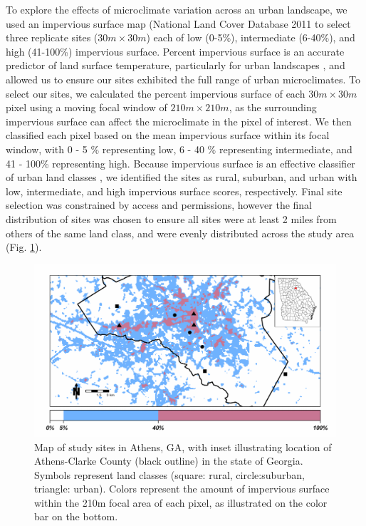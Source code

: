 \documentclass[12pt]{article}
\begin{document}
To explore the effects of microclimate variation across an urban landscape, we used an impervious surface map (National Land Cover Database 2011 \citep{xian2011} to select three replicate sites ($30m \times 30m$) each of low (0-5\%), intermediate (6-40\%), and high (41-100\%) impervious surface. Percent impervious surface is an accurate predictor of land surface temperature, particularly for urban landscapes \citep{yuan2007}, and allowed us to ensure our sites exhibited the full range of urban microclimates. To select our sites, we calculated the percent impervious surface of each $30m \times 30m$ pixel using a moving focal window of $210m \times 210m$, as the surrounding impervious surface can affect the microclimate in the pixel of interest. We then classified each pixel based on the mean impervious surface within its focal window, with 0 - 5 \% representing low, 6 - 40 \% representing intermediate, and 41 - 100\% representing high. Because impervious surface is an effective classifier of urban land classes \citep{lu2006}, we identified the sites as rural, suburban, and urban with low, intermediate, and high impervious surface scores, respectively. Final site selection was constrained by access and permissions, however the final distribution of sites was chosen to ensure all sites were at least 2 miles from others of the same land class, and were evenly distributed across the study area (Fig. \ref{Fig:siteMap}).

\begin{figure}
\centering\includegraphics[width=0.9\linewidth]{siteMapinset.pdf}
\caption{Map of study sites in Athens, GA, with inset illustrating location of Athens-Clarke County (black outline) in the state of Georgia. Symbols represent land classes (square: rural, circle:suburban, triangle: urban). Colors represent the amount of impervious surface within the 210m focal area of each pixel, as illustrated on the color bar on the bottom.}
\label{Fig:siteMap}
\end{figure}
\end{document}
